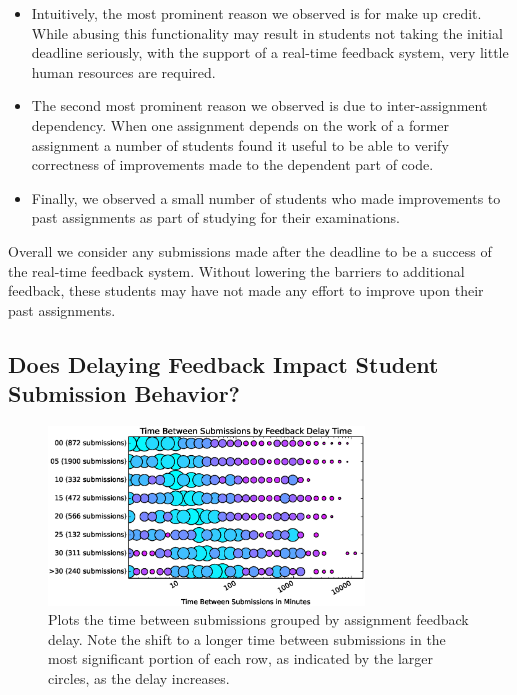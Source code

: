 \begin{itemize}
\item Intuitively, the most prominent reason we observed is for make up
  credit. While abusing this functionality may result in students not taking
  the initial deadline seriously, with the support of a real-time feedback
  system, very little human resources are required.
\item The second most prominent reason we observed is due to inter-assignment
  dependency. When one assignment depends on the work of a former assignment a
  number of students found it useful to be able to verify correctness of
  improvements made to the dependent part of code.
\item Finally, we observed a small number of students who made improvements to
  past assignments as part of studying for their examinations.
\end{itemize}

Overall we consider any submissions made after the deadline to be a success of
the real-time feedback system. Without lowering the barriers to additional
feedback, these students may have not made any effort to improve upon their
past assignments.

\subsection{Does Delaying Feedback Impact Student Submission Behavior?}

\begin{figure}[!t]
\centering \includegraphics[width=3.3in]{graphs/Time_Between_Submissions_by_Feedback_Delay_Time.eps}
\caption{Plots the time between submissions grouped by assignment feedback
  delay. Note the shift to a longer time between submissions in the most
  significant portion of each row, as indicated by the larger circles, as the
  delay increases.}
\end{figure}

